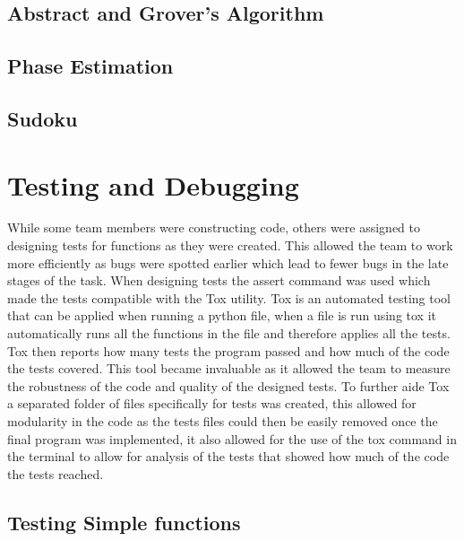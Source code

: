\documentclass{article}
\begin{document}
\subsection{Abstract and Grover's Algorithm}
\subsection{Phase Estimation}
\subsection{Sudoku}

\pagebreak

\section{Testing and Debugging}

While some team members were constructing code, others were assigned to designing tests for functions as they were created. This allowed the team to work more efficiently as bugs were spotted earlier which lead to fewer bugs in the late stages of the task. When designing tests the assert command was used which made the tests compatible with the Tox utility. Tox is an automated testing tool that can be applied when running a python file, when a file is run using tox it automatically runs all the functions in the file and therefore applies all the tests. Tox then reports how many tests the program passed and how much of the code the tests covered. This tool became invaluable as it allowed the team to measure the robustness of the code and quality of the designed tests. To further aide Tox a separated folder of files specifically for tests was created, this allowed for modularity in the code as the tests files could then be easily removed once the final program was implemented, it also allowed for the use of the tox command in the terminal to allow for analysis of the tests that showed how much of the code the tests reached.


\subsection{Testing Simple functions}
\end{document}
